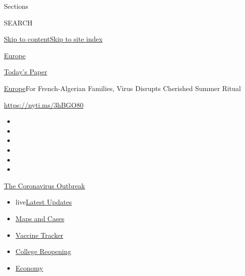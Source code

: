 Sections

SEARCH

\protect\hyperlink{site-content}{Skip to
content}\protect\hyperlink{site-index}{Skip to site index}

\href{https://www.nytimes3xbfgragh.onion/section/world/europe}{Europe}

\href{https://myaccount.nytimes3xbfgragh.onion/auth/login?response_type=cookie\&client_id=vi}{}

\href{https://www.nytimes3xbfgragh.onion/section/todayspaper}{Today's
Paper}

\href{/section/world/europe}{Europe}\textbar{}For French-Algerian
Families, Virus Disrupts Cherished Summer Ritual

\url{https://nyti.ms/3hBGO80}

\begin{itemize}
\item
\item
\item
\item
\item
\item
\end{itemize}

\href{https://www.nytimes3xbfgragh.onion/news-event/coronavirus?action=click\&pgtype=Article\&state=default\&region=TOP_BANNER\&context=storylines_menu}{The
Coronavirus Outbreak}

\begin{itemize}
\tightlist
\item
  live\href{https://www.nytimes3xbfgragh.onion/2020/08/03/world/coronavirus-covid-19.html?action=click\&pgtype=Article\&state=default\&region=TOP_BANNER\&context=storylines_menu}{Latest
  Updates}
\item
  \href{https://www.nytimes3xbfgragh.onion/interactive/2020/us/coronavirus-us-cases.html?action=click\&pgtype=Article\&state=default\&region=TOP_BANNER\&context=storylines_menu}{Maps
  and Cases}
\item
  \href{https://www.nytimes3xbfgragh.onion/interactive/2020/science/coronavirus-vaccine-tracker.html?action=click\&pgtype=Article\&state=default\&region=TOP_BANNER\&context=storylines_menu}{Vaccine
  Tracker}
\item
  \href{https://www.nytimes3xbfgragh.onion/2020/08/02/us/covid-college-reopening.html?action=click\&pgtype=Article\&state=default\&region=TOP_BANNER\&context=storylines_menu}{College
  Reopening}
\item
  \href{https://www.nytimes3xbfgragh.onion/live/2020/08/03/business/stock-market-today-coronavirus?action=click\&pgtype=Article\&state=default\&region=TOP_BANNER\&context=storylines_menu}{Economy}
\end{itemize}


